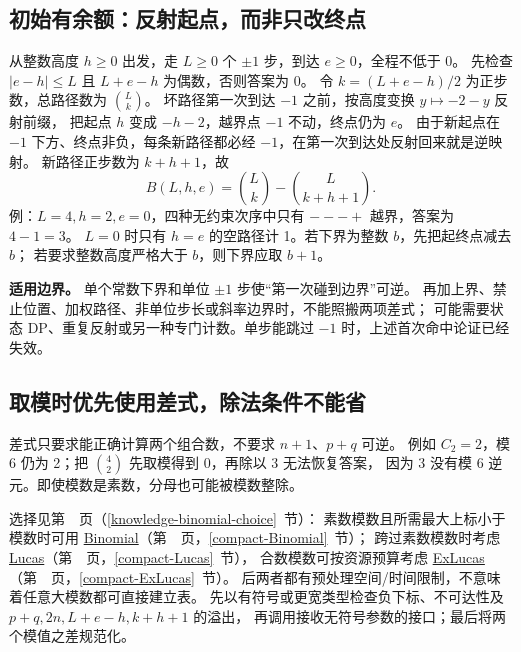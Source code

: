 \newpage
\subsection{初始有余额：反射起点，而非只改终点}
从整数高度 $h\ge0$ 出发，走 $L\ge0$ 个 $\pm1$ 步，到达 $e\ge0$，全程不低于 0。
先检查 $|e-h|\le L$ 且 $L+e-h$ 为偶数，否则答案为 0。
令 $k=(L+e-h)/2$ 为正步数，总路径数为 $\binom Lk$。
坏路径第一次到达 $-1$ 之前，按高度变换 $y\mapsto-2-y$ 反射前缀，
把起点 $h$ 变成 $-h-2$，越界点 $-1$ 不动，终点仍为 $e$。
由于新起点在 $-1$ 下方、终点非负，每条新路径都必经 $-1$，在第一次到达处反射回来就是逆映射。
新路径正步数为 $k+h+1$，故
\[
B(L,h,e)=\binom Lk-\binom L{k+h+1}.
\]
例：$L=4,h=2,e=0$，四种无约束次序中只有 $---+$ 越界，答案为 $4-1=3$。
$L=0$ 时只有 $h=e$ 的空路径计 1。若下界为整数 $b$，先把起终点减去 $b$；
若要求整数高度严格大于 $b$，则下界应取 $b+1$。

\textbf{适用边界。} 单个常数下界和单位 $\pm1$ 步使“第一次碰到边界”可逆。
再加上界、禁止位置、加权路径、非单位步长或斜率边界时，不能照搬两项差式；
可能需要状态 DP、重复反射或另一种专门计数。单步能跳过 $-1$ 时，上述首次命中论证已经失效。

\subsection{取模时优先使用差式，除法条件不能省}
差式只要求能正确计算两个组合数，不要求 $n+1$、$p+q$ 可逆。
例如 $C_2=2$，模 6 仍为 2；把 $\binom42$ 先取模得到 0，再除以 3 无法恢复答案，
因为 3 没有模 6 逆元。即使模数是素数，分母也可能被模数整除。

选择见第~\pageref{knowledge-binomial-choice}~页（\ref{knowledge-binomial-choice}~节）：
素数模数且所需最大上标小于模数时可用
\hyperref[compact-Binomial]{Binomial}（第~\pageref{compact-Binomial}~页，\ref{compact-Binomial}~节）；
跨过素数模数时考虑
\hyperref[compact-Lucas]{Lucas}（第~\pageref{compact-Lucas}~页，\ref{compact-Lucas}~节），
合数模数可按资源预算考虑
\hyperref[compact-ExLucas]{ExLucas}（第~\pageref{compact-ExLucas}~页，\ref{compact-ExLucas}~节）。
后两者都有预处理空间/时间限制，不意味着任意大模数都可直接建立表。
先以有符号或更宽类型检查负下标、不可达性及 $p+q,2n,L+e-h,k+h+1$ 的溢出，
再调用接收无符号参数的接口；最后将两个模值之差规范化。

\newpage
